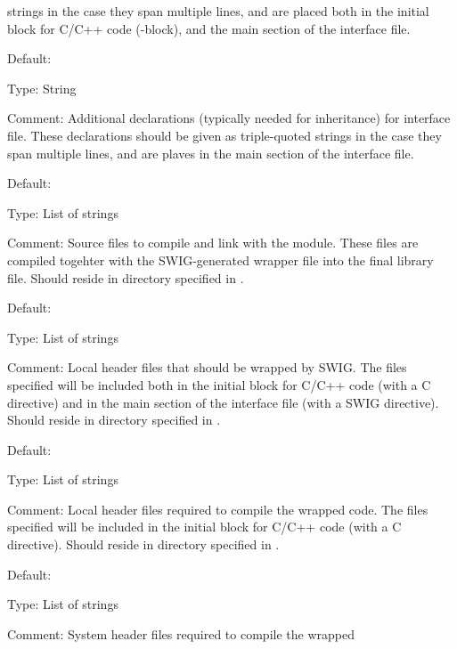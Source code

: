       strings in the case they span multiple lines, and are placed both in the
      initial block for C/C++ code (\emp{\%\{,\%\}}-block), and the main section
      of the interface file.
  \eit
\item {}
  \bit
    \item Default: 
    \item Type: String
    \item Comment: Additional declarations (typically needed for inheritance)
      for interface file. These declarations should be given as triple-quoted
      strings in the case they span multiple lines, and are plaves in the main
      section of the interface file.
  \eit
\item {}
  \bit
    \item Default: \emp{[]}
    \item Type: List of strings
    \item Comment: Source files to compile and link with the module. These
      files are compiled togehter with the SWIG-generated wrapper file into
      the final library file. Should reside in directory specified in
      .
  \eit
\item {}
  \bit
    \item Default: \emp{[]}
    \item Type: List of strings
    \item Comment: Local header files that should be wrapped by SWIG. The
      files specified will be included both in the initial block for C/C++ code
      (with a C directive) and in the main section of the interface file (with
      a SWIG directive). Should reside in directory specified in
      .
  \eit
\item {}
  \bit
    \item Default: \emp{[]}
    \item Type: List of strings
    \item Comment: Local header files required to compile the wrapped
      code. The files specified will be included in the initial block for C/C++ code
      (with a C directive). Should reside in directory specified in
      .
  \eit
\item {}
  \bit
    \item Default: \emp{[]}
    \item Type: List of strings
    \item Comment: System header files required to compile the wrapped
